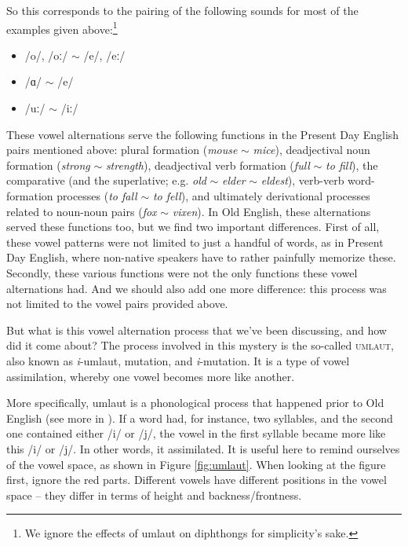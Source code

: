 \noindent So this corresponds to the pairing of the following sounds for most of the examples given above:\footnote{We ignore the effects of umlaut on diphthongs for simplicity's sake.}

\begin{itemize}
\item /o/, /oː/ $\sim$ /e/, /eː/
\item /ɑ/ $\sim$ /e/
\item /uː/ $\sim$ /iː/
\end{itemize}

\noindent These vowel alternations serve the following functions in the Present Day English pairs mentioned above: plural formation (\textit{mouse} $\sim$ \textit{mice}), deadjectival noun formation (\textit{strong} $\sim$ \textit{strength}), deadjectival verb formation (\textit{full} $\sim$ \textit{to fill}), the comparative (and the superlative; e.g. \textit{old} $\sim$ \textit{elder} $\sim$ \textit{eldest}), verb-verb word-formation processes (\textit{to fall} $\sim$ \textit{to fell}), and ultimately derivational processes related to noun-noun pairs (\textit{fox} $\sim$ \textit{vixen}). In Old English, these alternations served these functions too, but we find two important differences. First of all, these vowel patterns were not limited to just a handful of words, as in Present Day English, where non-native speakers have to rather painfully memorize these. Secondly, these various functions were not the only functions these vowel alternations had. And we should also add one more difference: this process was not limited to the vowel pairs provided above. 

But what is this vowel alternation process that we've been discussing, and how did it come about? The process involved in this mystery is the so-called \textsc{umlaut}, also known as \emph{i}-umlaut, mutation, and \emph{i}-mutation. It is a type of vowel assimilation, whereby one vowel becomes more like another. 

More specifically, umlaut is a phonological process that happened prior to Old English (see more in ). If a word had, for instance, two syllables, and the second one contained either /i/ or /j/, the vowel in the first syllable became more like this /i/ or /j/. In other words, it assimilated. It is useful here to remind ourselves of the vowel space, as shown in Figure \ref{fig:umlaut}. When looking at the figure first, ignore the red parts. Different vowels have different positions in the vowel space -- they differ in terms of height and backness/frontness.

